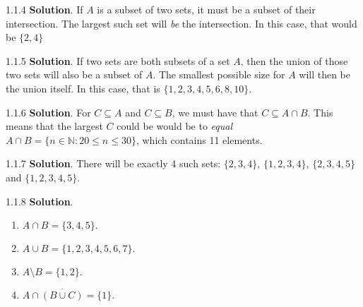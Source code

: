\documentclass[11pt,]{book}
\theoremstyle{ptxplainnotitle}
\theoremstyle{ptxplaintitle}
\theoremstyle{ptxdefinitionnotitle}
\theoremstyle{ptxdefinitiontitle}
\theoremstyle{ptxdefinitionnotitle}
\theoremstyle{ptxdefinitiontitle}
\theoremstyle{ptxdefinitionnotitle}
\theoremstyle{ptxdefinitiontitle}
\theoremstyle{ptxdefinitiontitlenonumber}
\theoremstyle{ptxdefinitiontitlenonumber}
\numberwithin{equation}{chapter}
\newcommand{\N}{\mathbb N}
\newcommand{\st}{:}
\renewcommand{\bar}{\overline}
\begin{document}
\begin{divisionexercise}{1.1.4}
\textbf{Solution}.\quad%
\hypertarget{p-870}{}%
If \(A\) is a subset of two sets, it must be a subset of their intersection.  The largest such set will \emph{be} the intersection.  In this case, that would be \(\{2,4\}\)%
\end{divisionexercise}%
\begin{divisionexercise}{1.1.5}
\textbf{Solution}.\quad%
\hypertarget{p-876}{}%
If two sets are both subsets of a set \(A\text{,}\) then the union of those two sets will also be a subset of \(A\text{.}\)  The smallest possible size for \(A\) will then be the union itself. In this case, that is \(\{1,2,3,4,5,6,8,10\}\text{.}\)%
\end{divisionexercise}%
\begin{divisionexercise}{1.1.6}
\textbf{Solution}.\quad%
\hypertarget{p-882}{}%
For \(C \subseteq A\) and \(C \subseteq B\text{,}\) we must have that \(C \subseteq A \cap B\text{.}\)  This means that the largest \(C\) could be would be to \emph{equal} \(A \cap B = \{n \in \N \st 20 \le n \le 30\}\text{,}\) which contains 11 elements.%
\end{divisionexercise}%
\begin{divisionexercise}{1.1.7}
\textbf{Solution}.\quad%
\hypertarget{p-890}{}%
There will be exactly 4 such sets: \(\{2, 3, 4\}\text{,}\) \(\{1,2,3,4\}\text{,}\) \(\{2,3,4,5\}\) and \(\{1,2,3,4,5\}\text{.}\)%
\end{divisionexercise}%
\begin{divisionexercise}{1.1.8}
\textbf{Solution}.\quad%
\hypertarget{p-910}{}%
\leavevmode%
\begin{enumerate}[label=\alph*.]
\item\hypertarget{li-393}{}\hypertarget{p-911}{}%
\(A \cap B = \{3,4,5\}\text{.}\)%
\item\hypertarget{li-394}{}\hypertarget{p-912}{}%
\(A \cup B = \{1,2,3,4,5,6,7\}\text{.}\)%
\item\hypertarget{li-395}{}\hypertarget{p-913}{}%
\(A \setminus B = \{1,2\}\text{.}\)%
\item\hypertarget{li-396}{}\hypertarget{p-914}{}%
\(A \cap \bar{(B \cup C)} = \{1\}\text{.}\)%
\end{enumerate}
%
\end{divisionexercise}%
\end{document}
